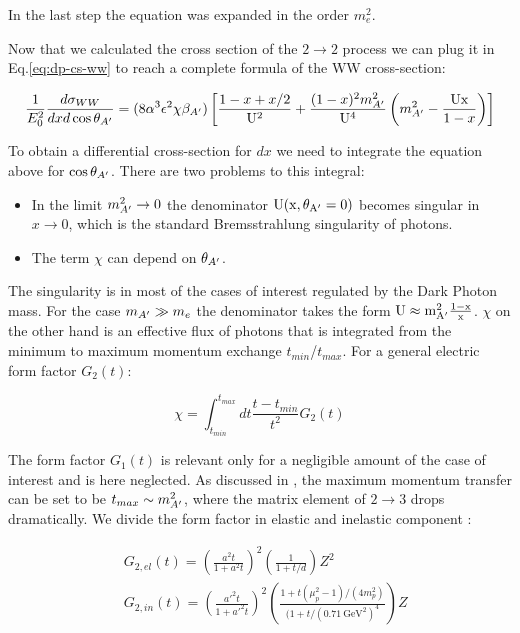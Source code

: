  In the last step the equation was expanded in the order $m^2_e$.

 Now that we calculated the cross section of the $2 \to 2$ process we can plug it in Eq.\ref{eq:dp-cs-ww} to reach a complete formula of the WW cross-section:

 \begin{equation}
   \label{eq:dp-cs-ww-num}
   \frac{1}{E^2_0} \frac{d\sigma_{WW}}{dx d\cos{\theta_{A'}}} = (8 \alpha^3 \epsilon^2 \chi \beta_{A'}) \left[ \frac{1 - x + x/2}{\rm{U}^2} + \frac{(1-x)^2m^2_{A'}}{\rm{U}^4} \left(m^2_{A'} - \frac{\rm{U}x}{1 - x} \right) \right]
 \end{equation}

 To obtain a differential cross-section for $dx$ we need to integrate the equation above for $\cos{\theta_{A'}}$. There are two problems to this integral:

 \begin{itemize}
 \item In the limit $m^2_{A'} \to 0$ the denominator $\rm{U}(x, \theta_{A'} = 0)$ becomes singular in $x \to 0$, which is the standard Bremsstrahlung singularity of photons.   
 \item The term $\chi$ can depend on $\theta_{A'}$.
 \end{itemize}

 The singularity is in most of the cases of interest regulated by the Dark Photon mass. For the case $m_{A'} \gg m_e$ the denominator takes the form $\rm{U} \approx m^2_{A'} \frac{1-x}{x}$.
 $\chi$ on the other hand is an effective flux of photons that is integrated from the minimum to maximum momentum exchange $t_{min}$/$t_{max}$. For a general electric form factor $G_2(t)$:

 \begin{equation}
   \label{eq:g-ff}
   \chi = \int^{t_{max}}_{t_{min}} dt \frac{t - t_{min}}{t^2} G_2(t)
 \end{equation}

 The form factor $G_1(t)$ is relevant only for a negligible amount of the case of interest and is here neglected. As discussed in \cite{Kim:1973he,RevModPhys.46.815}, the maximum momentum transfer can be set to be $t_{max} \sim m^2_{A'}$, where the matrix element of $2 \to 3$ drops dramatically. We divide the form factor in elastic and inelastic component \cite{jdb}:

 \begin{align}
   \label{eq:g-ff-el}
   &G_{2,el}(t) = \left( \frac{a^2 t}{1 + a^2t} \right)^2 \left( \frac{1}{1 + t/d}\right) Z^2\\
   \label{eq:g-ff-in}
   &G_{2,in}(t) = \left( \frac{a'^2 t }{1 + a'^2 t} \right)^2 \left( \frac{1 + t (\mu_p^2 -1) / (4m^2_p)}{(1 + t / (\SI{0.71}{\giga\electronvolt\squared})^4} \right) Z
 \end{align}

